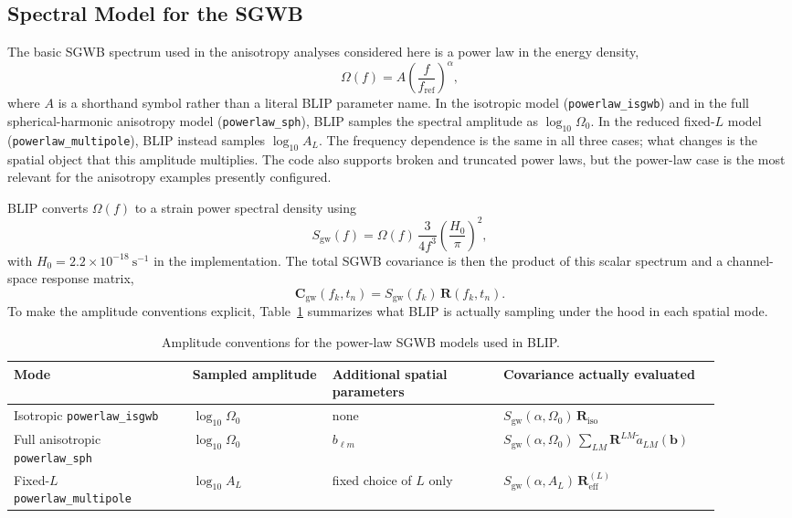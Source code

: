 \documentclass[11pt]{article}
\begin{document}
\subsection{Spectral Model for the SGWB}
The basic SGWB spectrum used in the anisotropy analyses considered here is a power law in the energy density,
\begin{equation}
\Omega(f)=A\left(\frac{f}{f_{\mathrm{ref}}}\right)^{\alpha},
\end{equation}
where $A$ is a shorthand symbol rather than a literal BLIP parameter name. In the isotropic model (\texttt{powerlaw\_isgwb}) and in the full spherical-harmonic anisotropy model (\texttt{powerlaw\_sph}), BLIP samples the spectral amplitude as $\log_{10}\Omega_0$. In the reduced fixed-$L$ model (\texttt{powerlaw\_multipole}), BLIP instead samples $\log_{10}A_L$. The frequency dependence is the same in all three cases; what changes is the spatial object that this amplitude multiplies. The code also supports broken and truncated power laws, but the power-law case is the most relevant for the anisotropy examples presently configured.

BLIP converts $\Omega(f)$ to a strain power spectral density using
\begin{equation}
S_{\mathrm{gw}}(f)=\Omega(f)\,\frac{3}{4f^3}\left(\frac{H_0}{\pi}\right)^2,
\end{equation}
with $H_0=2.2\times10^{-18}\ \mathrm{s}^{-1}$ in the implementation. The total SGWB covariance is then the product of this scalar spectrum and a channel-space response matrix,
\begin{equation}
\mathbf{C}_{\mathrm{gw}}(f_k,t_n)=S_{\mathrm{gw}}(f_k)\,\mathbf{R}(f_k,t_n).
\end{equation}
To make the amplitude conventions explicit, Table~\ref{tab:amplitude_conventions} summarizes what BLIP is actually sampling under the hood in each spatial mode.

\begin{table}[H]
\centering
\caption{Amplitude conventions for the power-law SGWB models used in BLIP.}
\label{tab:amplitude_conventions}
\begin{tabular}{>{\raggedright\arraybackslash}p{0.23\linewidth} >{\raggedright\arraybackslash}p{0.18\linewidth} >{\raggedright\arraybackslash}p{0.22\linewidth} >{\raggedright\arraybackslash}p{0.27\linewidth}}
\toprule
Mode & Sampled amplitude & Additional spatial parameters & Covariance actually evaluated \\
\midrule
Isotropic \texttt{powerlaw\_isgwb} & $\log_{10}\Omega_0$ & none & $S_{\mathrm{gw}}(\alpha,\Omega_0)\,\mathbf{R}_{\mathrm{iso}}$ \\
Full anisotropic \texttt{powerlaw\_sph} & $\log_{10}\Omega_0$ & $b_{\ell m}$ & $S_{\mathrm{gw}}(\alpha,\Omega_0)\,\sum_{LM}\mathbf{R}^{LM}\tilde{a}_{LM}(\bm{b})$ \\
Fixed-$L$ \texttt{powerlaw\_multipole} & $\log_{10}A_L$ & fixed choice of $L$ only & $S_{\mathrm{gw}}(\alpha,A_L)\,\mathbf{R}^{(L)}_{\mathrm{eff}}$ \\
\bottomrule
\end{tabular}
\end{table}
\end{document}
